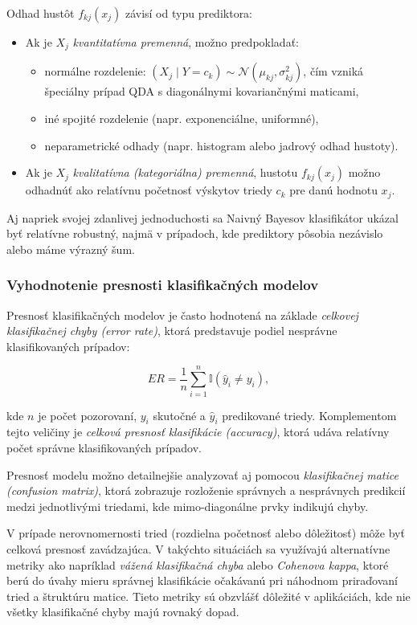 \medskip
\noindent
Odhad hustôt $f_{kj}(x_j)$ závisí od typu prediktora:
\begin{itemize}
  \item Ak je $X_j$ \textit{kvantitatívna premenná}, možno predpokladať:
  \begin{itemize}
    \item normálne rozdelenie: $(X_j \mid Y = c_k) \sim \mathcal{N}(\mu_{kj}, \sigma^2_{kj})$, čím vzniká špeciálny prípad QDA s diagonálnymi kovariančnými maticami,
    \item iné spojité rozdelenie (napr. exponenciálne, uniformné),
    \item neparametrické odhady (napr. histogram alebo jadrový odhad hustoty).
  \end{itemize}
  \item Ak je $X_j$ \textit{kvalitatívna (kategoriálna) premenná}, hustotu $f_{kj}(x_j)$ možno odhadnúť ako relatívnu početnosť výskytov triedy $c_k$ pre danú hodnotu $x_j$.
\end{itemize}

\noindent
Aj napriek svojej zdanlivej jednoduchosti sa Naivný Bayesov klasifikátor ukázal byť relatívne robustný, najmä v prípadoch, kde prediktory pôsobia nezávislo alebo máme výrazný šum.

\subsubsection{Vyhodnotenie presnosti klasifikačných modelov}

Presnosť klasifikačných modelov je často hodnotená na základe \textit{celkovej klasifikačnej chyby (error rate)}, ktorá predstavuje podiel nesprávne klasifikovaných prípadov:

\begin{equation}
ER = \frac{1}{n} \sum_{i=1}^{n} \mathbb{I}(\hat{y}_i \neq y_i),
\end{equation}

kde $n$ je počet pozorovaní, $y_i$ skutočné a $\hat{y}_i$ predikované triedy. Komplementom tejto veličiny je \textit{celková presnosť klasifikácie (accuracy)}, ktorá udáva relatívny počet správne klasifikovaných prípadov.

Presnosť modelu možno detailnejšie analyzovať aj pomocou \textit{klasifikačnej matice (confusion matrix)}, ktorá zobrazuje rozloženie správnych a nesprávnych predikcií medzi jednotlivými triedami, kde mimo-diagonálne prvky indikujú chyby.

V prípade nerovnomernosti tried (rozdielna početnosť alebo dôležitosť) môže byť celková presnosť zavádzajúca. V takýchto situáciách sa využívajú alternatívne metriky ako napríklad \textit{vážená klasifikačná chyba} alebo \textit{Cohenova kappa}, ktoré berú do úvahy mieru správnej klasifikácie očakávanú pri náhodnom priraďovaní tried a štruktúru matice. Tieto metriky sú obzvlášť dôležité v aplikáciách, kde nie všetky klasifikačné chyby majú rovnaký dopad.
